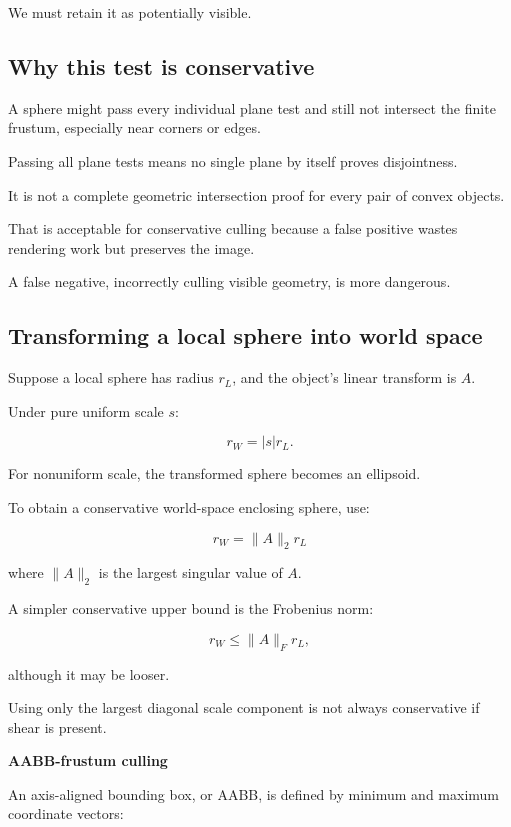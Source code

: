 We must retain it as potentially visible.

\subsection{Why this test is conservative}\label{02-foundations-ii-ch034-why-this-test-is-conservative}

A sphere might pass every individual plane test and still not intersect the finite frustum, especially near corners or edges.

Passing all plane tests means no single plane by itself proves disjointness.

It is not a complete geometric intersection proof for every pair of convex objects.

That is acceptable for conservative culling because a false positive wastes rendering work but preserves the image.

A false negative, incorrectly culling visible geometry, is more dangerous.

\subsection{Transforming a local sphere into world space}\label{02-foundations-ii-ch034-transforming-a-local-sphere-into-world-space}

Suppose a local sphere has radius \(r_L\), and the object's linear transform is \(A\).

Under pure uniform scale \(s\):

\[
 r_W=|s|r_L.
\]

For nonuniform scale, the transformed sphere becomes an ellipsoid.

To obtain a conservative world-space enclosing sphere, use:

\[
 \boxed{ r_W=\|A\|_2r_L }
\]

where \(\|A\|_2\) is the largest singular value of \(A\).

A simpler conservative upper bound is the Frobenius norm:

\[
 r_W\le\|A\|_Fr_L,
\]

although it may be looser.

Using only the largest diagonal scale component is not always conservative if shear is present.

\textbf{AABB-frustum culling}

An axis-aligned bounding box, or AABB, is defined by minimum and maximum coordinate vectors:

